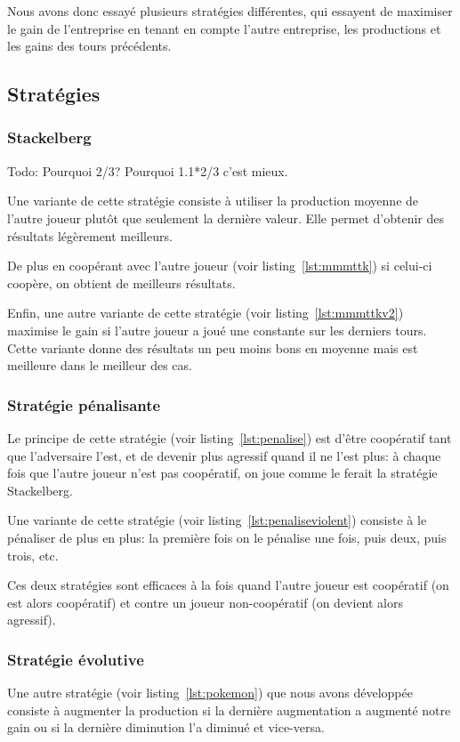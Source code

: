 \documentclass{scrartcl}
\begin{document}
    Nous avons donc essayé plusieurs stratégies différentes, qui essayent de
    maximiser le gain de l'entreprise en tenant en compte l'autre entreprise,
    les productions et les gains des tours précédents.

  \subsection{Stratégies}
    \subsubsection{Stackelberg}
      Todo: Pourquoi 2/3? Pourquoi 1.1*2/3 c'est mieux.

      Une variante de cette stratégie consiste à utiliser la production moyenne
      de l'autre joueur plutôt que seulement la dernière valeur. Elle permet
      d'obtenir des résultats légèrement meilleurs.

      De plus en coopérant avec l'autre joueur (voir listing~\ref{lst:mmmttk})
      si celui-ci coopère, on obtient de meilleurs résultats.

      Enfin, une autre variante de cette stratégie (voir
      listing~\ref{lst:mmmttkv2}) maximise le gain si l'autre joueur a joué une
      constante sur les derniers tours. Cette variante donne des résultats
      un peu moins bons en moyenne mais est meilleure dans le meilleur des cas.

    \subsubsection{Stratégie pénalisante}
      Le principe de cette stratégie (voir listing~\ref{lst:penalise}) est
      d'être coopératif tant que l'adversaire l'est, et de devenir plus
      agressif quand il ne l'est plus: à chaque fois que l'autre joueur n'est
      pas coopératif, on joue comme le ferait la stratégie Stackelberg.

      Une variante de cette stratégie (voir listing~\ref{lst:penaliseviolent})
      consiste à le pénaliser de plus en plus: la première fois on le pénalise
      une fois, puis deux, puis trois, etc.

      Ces deux stratégies sont efficaces à la fois quand l'autre joueur est
      coopératif (on est alors coopératif) et contre un joueur non-coopératif
      (on devient alors agressif).

    \subsubsection{Stratégie évolutive}
      Une autre stratégie (voir listing~\ref{lst:pokemon}) que nous avons
      développée consiste à augmenter la production si la dernière augmentation
      a augmenté notre gain ou si la dernière diminution l'a diminué et
      vice-versa.
\end{document}

